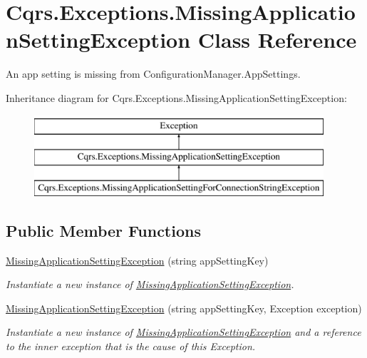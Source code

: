 \hypertarget{classCqrs_1_1Exceptions_1_1MissingApplicationSettingException}{}\section{Cqrs.\+Exceptions.\+Missing\+Application\+Setting\+Exception Class Reference}
\label{classCqrs_1_1Exceptions_1_1MissingApplicationSettingException}


An app setting is missing from Configuration\+Manager.\+App\+Settings.  


Inheritance diagram for Cqrs.\+Exceptions.\+Missing\+Application\+Setting\+Exception\+:\begin{figure}[H]
\begin{center}
\leavevmode
\includegraphics[height=3.000000cm]{classCqrs_1_1Exceptions_1_1MissingApplicationSettingException}
\end{center}
\end{figure}
\subsection*{Public Member Functions}
\begin{DoxyCompactItemize}
\item 
\hyperlink{classCqrs_1_1Exceptions_1_1MissingApplicationSettingException_a2d3f993341db578dba04ab7b6a799ee3_a2d3f993341db578dba04ab7b6a799ee3}{Missing\+Application\+Setting\+Exception} (string app\+Setting\+Key)
\begin{DoxyCompactList}\small\item\em Instantiate a new instance of \hyperlink{classCqrs_1_1Exceptions_1_1MissingApplicationSettingException}{Missing\+Application\+Setting\+Exception}. \end{DoxyCompactList}\item 
\hyperlink{classCqrs_1_1Exceptions_1_1MissingApplicationSettingException_a65e4f7ddf118364bfc59b27978d9b29d_a65e4f7ddf118364bfc59b27978d9b29d}{Missing\+Application\+Setting\+Exception} (string app\+Setting\+Key, Exception exception)
\begin{DoxyCompactList}\small\item\em Instantiate a new instance of \hyperlink{classCqrs_1_1Exceptions_1_1MissingApplicationSettingException}{Missing\+Application\+Setting\+Exception} and a reference to the inner {\itshape exception}  that is the cause of this Exception. \end{DoxyCompactList}\end{DoxyCompactItemize}
